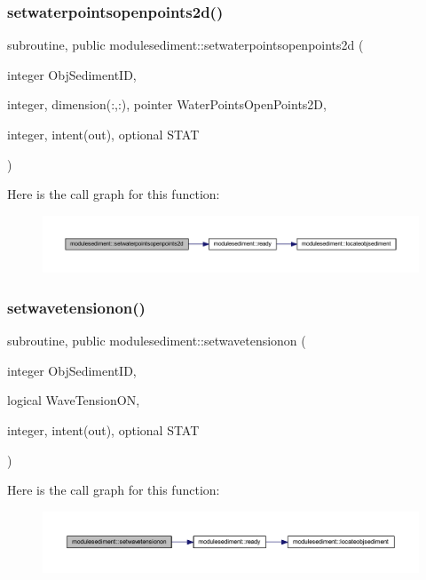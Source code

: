 \subsubsection{\texorpdfstring{setwaterpointsopenpoints2d()}{setwaterpointsopenpoints2d()}}
{\footnotesize\ttfamily subroutine, public modulesediment\+::setwaterpointsopenpoints2d (\begin{DoxyParamCaption}\item[{integer}]{Obj\+Sediment\+ID,  }\item[{integer, dimension(\+:,\+:), pointer}]{Water\+Points\+Open\+Points2D,  }\item[{integer, intent(out), optional}]{S\+T\+AT }\end{DoxyParamCaption})}

Here is the call graph for this function\+:\nopagebreak
\begin{figure}[H]
\begin{center}
\leavevmode
\includegraphics[width=350pt]{namespacemodulesediment_a8c48bc8f4d2f029c54181f59654feaa5_cgraph}
\end{center}
\end{figure}
\mbox{\label{namespacemodulesediment_a7549a71a1a07687cb5225c5c8441cb72}} 
\subsubsection{\texorpdfstring{setwavetensionon()}{setwavetensionon()}}
{\footnotesize\ttfamily subroutine, public modulesediment\+::setwavetensionon (\begin{DoxyParamCaption}\item[{integer}]{Obj\+Sediment\+ID,  }\item[{logical}]{Wave\+Tension\+ON,  }\item[{integer, intent(out), optional}]{S\+T\+AT }\end{DoxyParamCaption})}

Here is the call graph for this function\+:\nopagebreak
\begin{figure}[H]
\begin{center}
\leavevmode
\includegraphics[width=350pt]{namespacemodulesediment_a7549a71a1a07687cb5225c5c8441cb72_cgraph}
\end{center}
\end{figure}
\mbox{\label{namespacemodulesediment_ac07e155e923f9f500063126c9e4f7ede}} 
